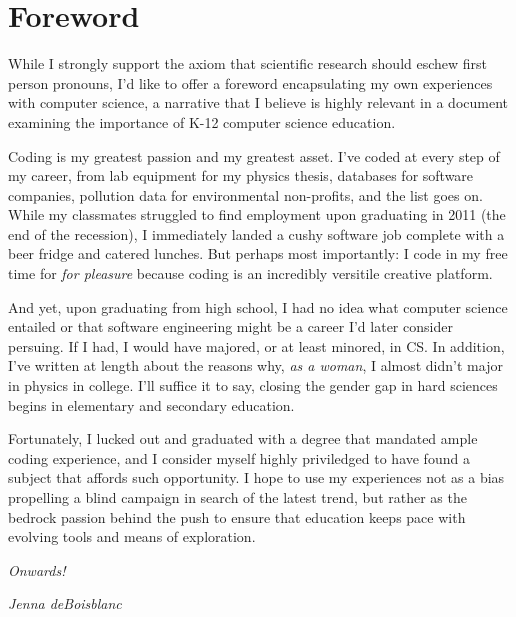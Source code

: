\chapter{Foreword} %

\label{Foreword} %


While I strongly support the axiom that scientific research should eschew first person pronouns, I'd like to offer a foreword encapsulating my own experiences with computer science, a narrative that I believe is highly relevant in a document examining the importance of K-12 computer science education. \par  
Coding is my greatest passion and my greatest asset. I've coded at every step of my career, from lab equipment for my physics thesis, databases for software companies, pollution data for environmental non-profits, and the list goes on. While my classmates struggled to find employment upon graduating in 2011 (the end of the recession), I immediately landed a cushy software job complete with a beer fridge and catered lunches. But perhaps most importantly: I code in my free time for \emph{for pleasure} because coding is an incredibly versitile creative platform. \par
And yet, upon graduating from high school, I had no idea what computer science entailed or that software engineering might be a career I'd later consider persuing. If I had, I would have majored, or at least minored, in CS. In addition, I've written at length about the reasons why, \textit{as a woman}, I almost didn't major in physics in college. I'll suffice it to say, closing the gender gap in hard sciences begins in elementary and secondary education. \par
Fortunately, I lucked out and graduated with a degree that mandated ample coding experience, and I consider myself highly priviledged to have found a subject that affords such opportunity. I hope to use my experiences not as a bias propelling a blind campaign in search of the latest trend, but rather as the bedrock passion behind the push to ensure that education keeps pace with evolving tools and means of exploration. \par 
\emph{Onwards!} \par
\emph{Jenna deBoisblanc}